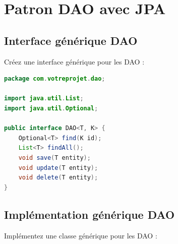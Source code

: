 \documentclass[11pt]{article}
\begin{document}
\section{Patron DAO avec JPA}

\subsection{Interface générique DAO}
Créez une interface générique pour les DAO :

\begin{lstlisting}[language=Java]
package com.votreprojet.dao;

import java.util.List;
import java.util.Optional;

public interface DAO<T, K> {
    Optional<T> find(K id);
    List<T> findAll();
    void save(T entity);
    void update(T entity);
    void delete(T entity);
}
\end{lstlisting}

\subsection{Implémentation générique DAO}
Implémentez une classe générique pour les DAO :
\end{document}
